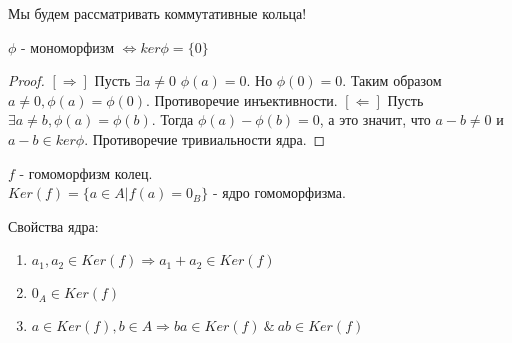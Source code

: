 Мы будем рассматривать коммутативные кольца!

\begin{thm}
$ \phi $ - мономорфизм $ \Leftrightarrow ker \phi = \{0\} $
\end{thm}
\begin{proof}
  $ [\Rightarrow] $ Пусть $ \exists a \ne 0 $ $ \phi(a) = 0 $. Но $ \phi(0) = 0 $. Таким образом $ a \ne 0, \phi(a) = \phi(0) $. 
  Противоречие инъективности. \newline
  $ [\Leftarrow] $ Пусть $ \exists a \ne b, \phi(a) = \phi(b) $. Тогда $ \phi(a) - \phi(b) = 0 $,
  а это значит, что $ a - b \ne 0 $ и $ a - b \in ker \phi $. Противоречие тривиальности ядра. 
\end{proof}

\begin{defn}
$f$ - гомоморфизм колец.\\
$Ker(f) = \{a \in A| f(a) = 0_B\}$ - ядро гомоморфизма.
\end{defn}

Свойства ядра:
\begin{enumerate}
 \item $a_1, a_2 \in Ker(f) \Rightarrow a_1 + a_2 \in Ker(f)$
 \item $0_A \in Ker(f)$
 \item $a \in Ker(f), b \in A \Rightarrow ba \in Ker(f)~\&~ab \in Ker(f)$
\end{enumerate}

